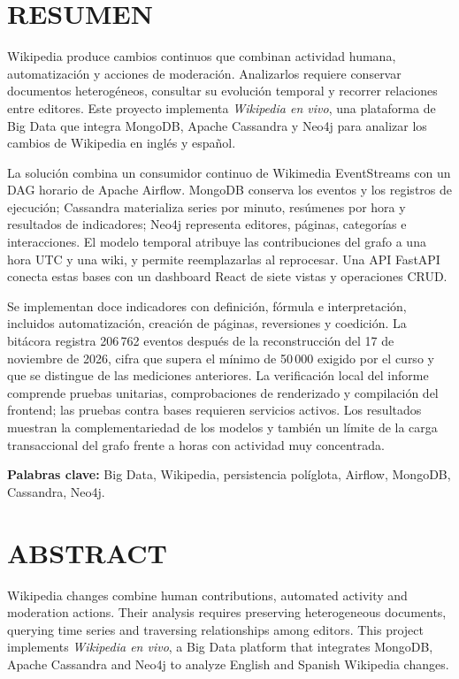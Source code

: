 \chapter*{RESUMEN}
Wikipedia produce cambios continuos que combinan actividad humana, automatización y acciones de moderación. Analizarlos requiere conservar documentos heterogéneos, consultar su evolución temporal y recorrer relaciones entre editores. Este proyecto implementa \textit{Wikipedia en vivo}, una plataforma de Big Data que integra MongoDB, Apache Cassandra y Neo4j para analizar los cambios de Wikipedia en inglés y español.

La solución combina un consumidor continuo de Wikimedia EventStreams con un DAG horario de Apache Airflow. MongoDB conserva los eventos y los registros de ejecución; Cassandra materializa series por minuto, resúmenes por hora y resultados de indicadores; Neo4j representa editores, páginas, categorías e interacciones. El modelo temporal atribuye las contribuciones del grafo a una hora UTC y una wiki, y permite reemplazarlas al reprocesar. Una API FastAPI conecta estas bases con un dashboard React de siete vistas y operaciones CRUD.

Se implementan doce indicadores con definición, fórmula e interpretación, incluidos automatización, creación de páginas, reversiones y coedición. La bitácora registra 206\,762 eventos después de la reconstrucción del 17 de noviembre de 2026, cifra que supera el mínimo de 50\,000 exigido por el curso y que se distingue de las mediciones anteriores. La verificación local del informe comprende pruebas unitarias, comprobaciones de renderizado y compilación del frontend; las pruebas contra bases requieren servicios activos. Los resultados muestran la complementariedad de los modelos y también un límite de la carga transaccional del grafo frente a horas con actividad muy concentrada.

\noindent\textbf{Palabras clave:} Big Data, Wikipedia, persistencia políglota, Airflow, MongoDB, Cassandra, Neo4j.

\chapter*{ABSTRACT}
Wikipedia changes combine human contributions, automated activity and moderation actions. Their analysis requires preserving heterogeneous documents, querying time series and traversing relationships among editors. This project implements \textit{Wikipedia en vivo}, a Big Data platform that integrates MongoDB, Apache Cassandra and Neo4j to analyze English and Spanish Wikipedia changes.

